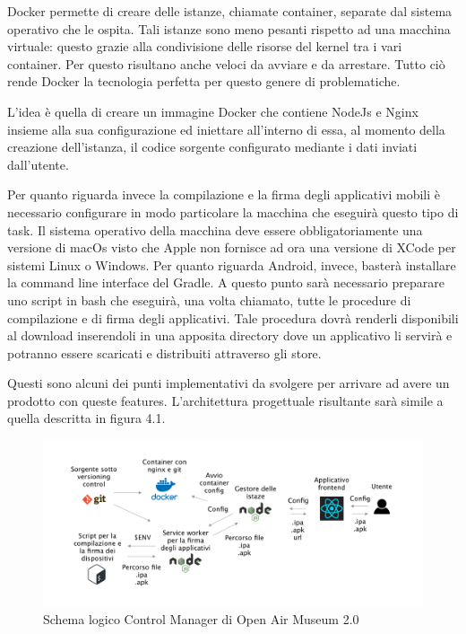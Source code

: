  Docker permette di creare delle istanze, chiamate container, separate dal sistema operativo che le ospita. Tali istanze sono meno pesanti rispetto ad una macchina virtuale: questo grazie alla condivisione delle risorse del kernel tra i vari container. Per questo risultano anche veloci da avviare e da arrestare. Tutto ciò rende Docker la tecnologia perfetta per questo genere di problematiche.\vspace{5mm}
 
L’idea è quella di creare un immagine Docker che contiene NodeJs e Nginx insieme alla sua configurazione ed iniettare all’interno di essa, al momento della creazione dell’istanza, il codice sorgente configurato mediante i dati inviati dall’utente.\vspace{5mm}

Per quanto riguarda invece la compilazione e la firma degli applicativi mobili è necessario configurare in modo particolare la macchina che eseguirà questo tipo di task. Il sistema operativo della macchina deve essere obbligatoriamente una versione di macOs visto che Apple non fornisce ad ora una versione di XCode per sistemi Linux o Windows. Per quanto riguarda Android, invece, basterà installare la command line interface del Gradle. A questo punto sarà necessario preparare uno script in bash che eseguirà, una volta chiamato, tutte le procedure di compilazione e di firma degli applicativi. Tale procedura dovrà renderli disponibili al download inserendoli in una apposita directory dove un applicativo li servirà e potranno essere scaricati e distribuiti attraverso gli store.\vspace{5mm}

Questi sono alcuni dei punti implementativi da svolgere per arrivare ad avere un prodotto con queste features. L’architettura progettuale risultante sarà simile a quella descritta in figura 4.1.\vspace{5mm}

\begin{figure}[h]
\centering
\includegraphics[width=1\textwidth]{images/schemaIstanzeAlakai.png}
\caption{Schema logico Control Manager di Open Air Museum 2.0}
\end{figure}

